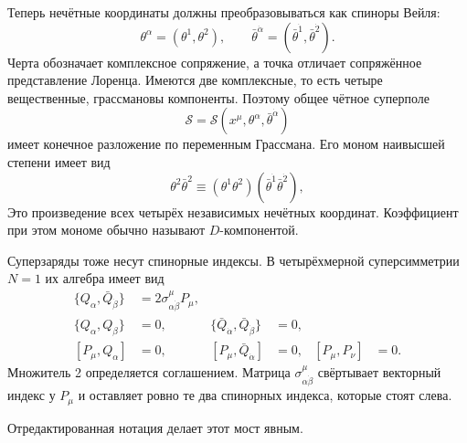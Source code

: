 Теперь нечётные координаты должны преобразовываться как спиноры Вейля: \begin{equation}
\theta^\alpha=(\theta^1,\theta^2),
\qquad
\bar\theta^{\dot\alpha}=(\bar\theta^{\dot1},\bar\theta^{\dot2}).
\end{equation} Черта обозначает комплексное сопряжение, а точка отличает сопряжённое представление Лоренца. Имеются две комплексные, то есть четыре вещественные, грассмановы компоненты. Поэтому общее чётное суперполе \begin{equation}
\mathcal S=\mathcal S(x^\mu,\theta^\alpha,\bar\theta^{\dot\alpha})
\end{equation} имеет конечное разложение по переменным Грассмана. Его моном наивысшей степени имеет вид \begin{equation}
\theta^2\bar\theta^2
\equiv
(\theta^1\theta^2)(\bar\theta^{\dot1}\bar\theta^{\dot2}),
\end{equation} Это произведение всех четырёх независимых нечётных координат. Коэффициент при этом мономе обычно называют \(D\)-компонентой.

Суперзаряды тоже несут спинорные индексы. В четырёхмерной суперсимметрии \(N=1\) их алгебра имеет вид \begin{align}
\{Q_\alpha,\bar Q_{\dot\beta}\}
&=2\sigma^\mu_{\alpha\dot\beta}P_\mu,
\label{eq:l8-superalgebra-main}\\
\{Q_\alpha,Q_\beta\}&=0,
&
\{\bar Q_{\dot\alpha},\bar Q_{\dot\beta}\}&=0,
\label{eq:l8-superalgebra-nilpotent}\\
[P_\mu,Q_\alpha]&=0,
&
[P_\mu,\bar Q_{\dot\alpha}]&=0,
&
[P_\mu,P_\nu]&=0.
\label{eq:l8-superalgebra-commutators}
\end{align} Множитель 2 определяется соглашением. Матрица \(\sigma^\mu_{\alpha\dot\beta}\) свёртывает векторный индекс у \(P_\mu\) и оставляет ровно те два спинорных индекса, которые стоят слева.

\begin{classroomqa}\end{classroomqa}

Отредактированная нотация делает этот мост явным.

